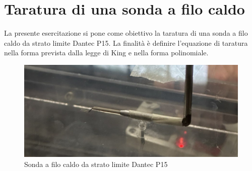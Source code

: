 \section{Taratura di una sonda a filo caldo}
La presente esercitazione si pone come obiettivo la taratura di una sonda a filo caldo da strato limite Dantec P15. La finalità è definire l'equazione di taratura nella forma prevista dalla legge di King e nella forma polinomiale.
\begin{figure}[H]
    \centering
    \includegraphics[width=.8\textwidth]{images/8/sondahw.jpg}
    \caption{Sonda a filo caldo da strato limite Dantec P15}
\end{figure}


